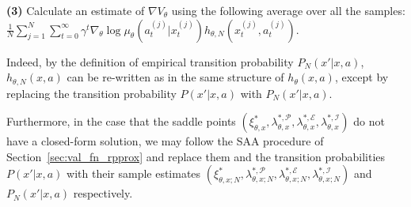 {\bf (3)} Calculate an estimate of $\nabla V_\theta$ using the following average over all the samples: $\frac{1}{N}\sum_{j=1}^N\sum_{t=0}^\infty\gamma^t\nabla_\theta\log\mu_\theta(a^{(j)}_t|x^{(j)}_t)h_{\theta,N}(x^{(j)}_t,a^{(j)}_t)$.

Indeed, by the definition of empirical transition probability $P_N(x'|x,a)$, $h_{\theta,N}(x,a)$ can be re-written as in the same structure of ${h}_{\theta}(x,a)$, except by replacing the transition probability $P(x'|x,a)$ with $P_N(x'|x,a)$.

Furthermore, in the case that the saddle points $(\xi^*_{\theta,x},\lambda^{*,\mathcal P}_{\theta,x},\lambda^{*,\mathcal E}_{\theta,x},\lambda^{*,\mathcal I}_{\theta,x}) $ do not have a closed-form solution, we may follow the SAA procedure of Section~\ref{sec:val_fn_rpprox} and replace them and the transition probabilities $P(x'|x,a)$ with their sample estimates $(\xi^*_{\theta,x;N},\lambda^{*,\mathcal P}_{\theta,x;N},\lambda^{*,\mathcal E}_{\theta,x;N},\lambda^{*,\mathcal I}_{\theta,x;N})$ and $P_N(x'|x,a)$ respectively.


